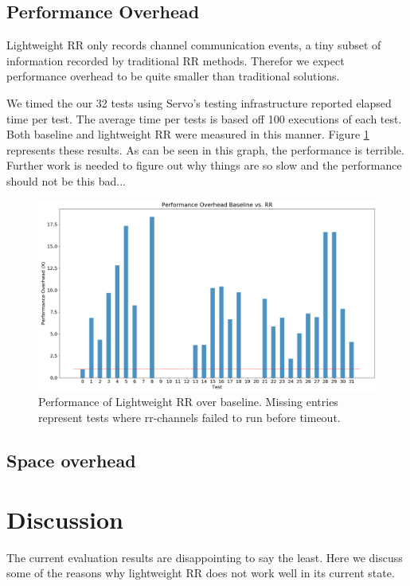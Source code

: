 \documentclass{article}
\begin{document}
\subsection{Performance Overhead}
Lightweight RR only records channel communication events, a tiny subset of information
recorded by traditional RR methods. Therefor we expect performance overhead to be quite
smaller than traditional solutions.

We timed the our 32 tests using Servo's testing infrastructure reported elapsed time
per test. The average time per tests is based off 100 executions of each test. Both
baseline and lightweight RR were measured in this manner. Figure \ref{fig:result_timing}
represents these results. As can be seen in this graph, the performance is terrible.
Further work is needed to figure out why things are so slow and the performance should not be this bad...

\begin{figure}
  \includegraphics[width=\linewidth]{result_timing.png}
  \caption{Performance of Lightweight RR over baseline. Missing entries represent
  tests where rr-channels failed to run before timeout.}
  \label{fig:result_timing}
\end{figure}



\subsection{Space overhead}
\section{Discussion}
\label{sec:discussion}
The current evaluation results are disappointing to say the least. Here we discuss
some of the reasons why lightweight RR does not work well in its current state.
\end{document}
